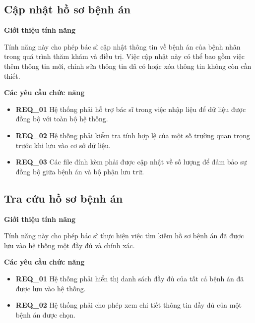 \subsection{Cập nhật hồ sơ bệnh án}

\noindent \textbf{Giới thiệu tính năng}

Tính năng này cho phép bác sĩ cập nhật thông tin về bệnh án của bệnh nhân trong quá trình thăm khám và điều trị. Việc cập nhật này có thể bao gồm việc thêm thông tin mới, chỉnh sửa thông tin đã có hoặc xóa thông tin không còn cần thiết.

\noindent \textbf{Các yêu cầu chức năng}
\begin{itemize}
  \item \textbf{REQ\_01} Hệ thống phải hỗ trợ bác sĩ trong việc nhập liệu để dữ liệu được đồng bộ với toàn bộ hệ thống.
  \item \textbf{REQ\_02} Hệ thống phải kiểm tra tính hợp lệ của một số trường quan trọng trước khi lưu vào cơ sở dữ liệu.
  \item \textbf{REQ\_03} Các file đính kèm phải được cập nhật về số lượng để đảm bảo sự đồng bộ giữa bệnh án và bộ phận lưu trữ.
\end{itemize}

\subsection{Tra cứu hồ sơ bệnh án}

\noindent \textbf{Giới thiệu tính năng}

Tính năng này cho phép bác sĩ thực hiện việc tìm kiếm hồ sơ bệnh án đã được lưu vào hệ thống một đầy đủ và chính xác.

\noindent \textbf{Các yêu cầu chức năng}
\begin{itemize}
  \item \textbf{REQ\_01} Hệ thống phải hiển thị danh sách đầy đủ của tất cả bệnh án đã được lưu vào hệ thống.
  \item \textbf{REQ\_02} Hệ thống phải cho phép xem chi tiết thông tin đầy đủ của một bệnh án được chọn.
\end{itemize}
